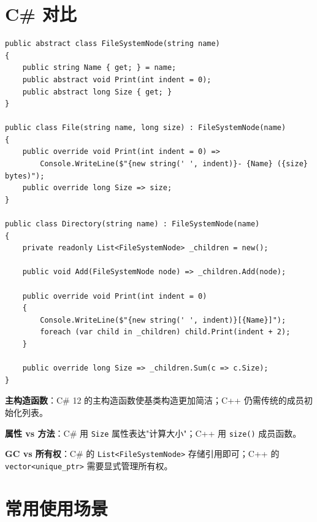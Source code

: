 \documentclass[12pt,a4paper,fontset=fandol]{ctexbook}
\begin{document}
\section{C\# 对比}

\begin{lstlisting}[style=csharpstyle, caption={组合模式 --- C\# 实现}]
public abstract class FileSystemNode(string name)
{
    public string Name { get; } = name;
    public abstract void Print(int indent = 0);
    public abstract long Size { get; }
}

public class File(string name, long size) : FileSystemNode(name)
{
    public override void Print(int indent = 0) =>
        Console.WriteLine($"{new string(' ', indent)}- {Name} ({size} bytes)");
    public override long Size => size;
}

public class Directory(string name) : FileSystemNode(name)
{
    private readonly List<FileSystemNode> _children = new();

    public void Add(FileSystemNode node) => _children.Add(node);

    public override void Print(int indent = 0)
    {
        Console.WriteLine($"{new string(' ', indent)}[{Name}]");
        foreach (var child in _children) child.Print(indent + 2);
    }

    public override long Size => _children.Sum(c => c.Size);
}
\end{lstlisting}

\begin{compare}
\textbf{主构造函数}：C\# 12 的主构造函数使基类构造更加简洁；C++ 仍需传统的成员初始化列表。

\textbf{属性 vs 方法}：C\# 用 \texttt{Size} 属性表达"计算大小"；C++ 用 \texttt{size()} 成员函数。

\textbf{GC vs 所有权}：C\# 的 \texttt{List<File\allowbreak{}System\allowbreak{}Node>} 存储引用即可；C++ 的 \texttt{vector<unique\_\allowbreak{}ptr>} 需要显式管理所有权。
\end{compare}

\section{常用使用场景}
\end{document}
